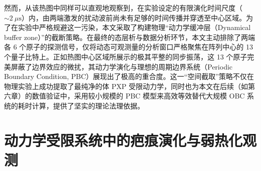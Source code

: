 \documentclass[../main.tex]{subfiles}
\begin{document}
然而，从该热图中同样可以直观地观察到，在实验设定的有限演化时间尺度（$\sim 2\ \mu\text{s}$）内，由两端激发的扰动波前尚未有足够的时间传播并穿透至中心区域。为了在实验中严格规避这一污染，本文采取了构建物理“动力学缓冲层（Dynamical buffer zone）”的截断策略。在最终的态层析与数据分析环节，本文主动排除了两端各 6 个原子的探测信号，仅将动态可观测量的分析窗口严格聚焦在阵列中心的 13 个量子比特上。正如热图中心区域所展示的极其平整的同步振荡，这 13 个原子完美屏蔽了边界效应的微扰，其动力学演化与理想的周期边界系统（Periodic Boundary Condition, PBC）展现出了极高的重合度。这一“空间截取”策略不仅在物理实验上成功提取了最纯净的体 PXP 受限动力学，同时也为本文在后续（如第六章）的数值验证中，采用较小规模的 PBC 模型来高效等效替代大规模 OBC 系统的耗时计算，提供了坚实的理论法理依据。








\section{动力学受限系统中的疤痕演化与弱热化观测}
\end{document}
